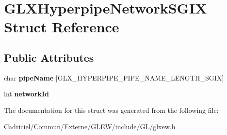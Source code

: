 \hypertarget{struct_g_l_x_hyperpipe_network_s_g_i_x}{\section{G\-L\-X\-Hyperpipe\-Network\-S\-G\-I\-X Struct Reference}
\label{struct_g_l_x_hyperpipe_network_s_g_i_x}
}
\subsection*{Public Attributes}
\begin{DoxyCompactItemize}
\item 
\hypertarget{struct_g_l_x_hyperpipe_network_s_g_i_x_a6338b9717fa895aec16b932f2ef693ed}{char {\bfseries pipe\-Name} \mbox{[}G\-L\-X\-\_\-\-H\-Y\-P\-E\-R\-P\-I\-P\-E\-\_\-\-P\-I\-P\-E\-\_\-\-N\-A\-M\-E\-\_\-\-L\-E\-N\-G\-T\-H\-\_\-\-S\-G\-I\-X\mbox{]}}\label{struct_g_l_x_hyperpipe_network_s_g_i_x_a6338b9717fa895aec16b932f2ef693ed}

\item 
\hypertarget{struct_g_l_x_hyperpipe_network_s_g_i_x_a81393053988b32fadb0b21615024add1}{int {\bfseries network\-Id}}\label{struct_g_l_x_hyperpipe_network_s_g_i_x_a81393053988b32fadb0b21615024add1}

\end{DoxyCompactItemize}


The documentation for this struct was generated from the following file\-:\begin{DoxyCompactItemize}
\item 
Cadriciel/\-Commun/\-Externe/\-G\-L\-E\-W/include/\-G\-L/glxew.\-h\end{DoxyCompactItemize}

